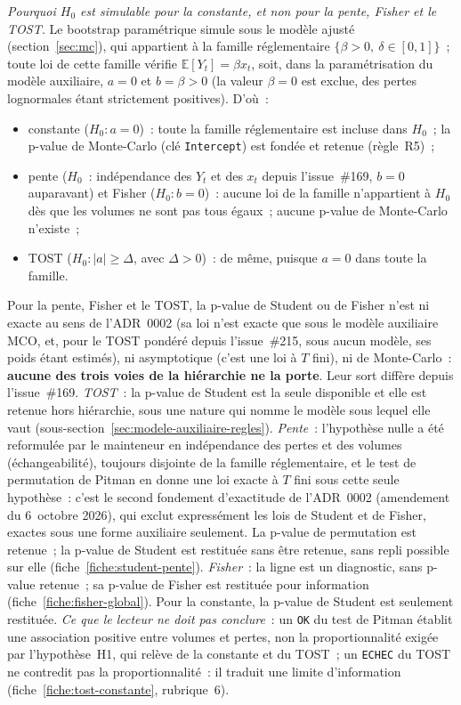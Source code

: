 \documentclass[a4paper,11pt]{article}
\newcommand{\code}[1]{\texttt{\small #1}}
\begin{document}
\emph{Pourquoi $H_0$ est simulable pour la constante, et non pour la pente, Fisher et le
TOST.} Le bootstrap paramétrique simule sous le modèle ajusté (section~\ref{sec:mc}), qui
appartient à la famille réglementaire $\{\beta > 0,\ \delta \in [0, 1]\}$~; toute loi de cette
famille vérifie $\mathbb{E}[Y_t] = \beta x_t$, soit, dans la paramétrisation du modèle auxiliaire,
$a = 0$ et $b = \beta > 0$ (la valeur $\beta = 0$ est exclue, des pertes lognormales étant
strictement positives). D'où~:
\begin{itemize}[itemsep=1pt]
  \item constante ($H_0 : a = 0$)~: toute la famille réglementaire est incluse dans $H_0$~; la
  p-value de Monte-Carlo (clé \code{Intercept}) est fondée et retenue (règle~R5)~;
  \item pente ($H_0$~: indépendance des $Y_t$ et des $x_t$ depuis l'issue~\#169, $b = 0$
  auparavant) et Fisher ($H_0 : b = 0$)~: aucune loi de la famille n'appartient à $H_0$ dès que
  les volumes ne sont pas tous égaux~; aucune p-value de Monte-Carlo n'existe~;
  \item TOST ($H_0 : |a| \ge \Delta$, avec $\Delta > 0$)~: de même, puisque $a = 0$ dans toute la
  famille.
\end{itemize}
Pour la pente, Fisher et le TOST, la p-value de Student ou de Fisher n'est ni exacte au sens de l'ADR~0002
(sa loi n'est exacte que sous le modèle auxiliaire MCO, et, pour le TOST pondéré depuis
l'issue~\#215, sous aucun modèle, ses poids étant estimés), ni asymptotique (c'est une loi à $T$ fini),
ni de Monte-Carlo~: \textbf{aucune des trois voies de la hiérarchie ne la porte}. Leur sort
diffère depuis l'issue~\#169. \emph{TOST}~: la p-value de Student est la seule disponible et
elle est retenue hors hiérarchie, sous une nature qui nomme le modèle sous lequel elle vaut
(sous-section~\ref{sec:modele-auxiliaire-regles}). \emph{Pente}~: l'hypothèse nulle a été
reformulée par le mainteneur en indépendance des pertes et des volumes (échangeabilité), toujours
disjointe de la famille réglementaire, et le test de permutation de Pitman en donne une loi
exacte à $T$ fini sous cette seule hypothèse~: c'est le second fondement d'exactitude de
l'ADR~0002 (amendement du 6~octobre 2026), qui exclut expressément les lois de Student et de
Fisher, exactes sous une forme auxiliaire seulement. La p-value de permutation est retenue~; la
p-value de Student est restituée sans être retenue, sans repli possible sur elle
(fiche~\ref{fiche:student-pente}). \emph{Fisher}~: la ligne est un diagnostic, sans p-value
retenue~; sa p-value de Fisher est restituée pour information (fiche~\ref{fiche:fisher-global}).
Pour la constante, la p-value de Student est seulement restituée. \emph{Ce que le lecteur ne doit
pas conclure}~: un \code{OK} du test de Pitman établit une association positive entre volumes et
pertes, non la proportionnalité exigée par l'hypothèse~H1, qui relève de la constante et du
TOST~; un \code{ECHEC} du TOST ne contredit pas la proportionnalité~: il traduit une limite
d'information (fiche~\ref{fiche:tost-constante}, rubrique~6).
\end{document}
